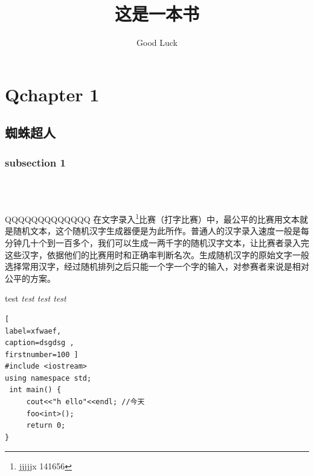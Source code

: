 \documentclass[12pt,hyperref,UTF8]{ctexbook}
\title{这是一本书}                              %
\author{Good Luck}                              %
\begin{document}
\frontmatter
\maketitle                        %

\cleardoublepage

\pagestyle{headings}              %

\tableofcontents                  %
 
 

\mainmatter

\pagestyle{mainFancy}
 

\cleardoublepage
%
%
\chapter{ Qchapter 1}
\section{蜘蛛超人}
\label{testsection}

\subsection{subsection 1}

{\small{}\\}
{\small{}\\}
{\small{}}

QQQQQQQQQQQQQ
在文字录入\footnote{jjjjjx 141656}比赛（打字比赛）中，最公平的比赛用文本就是随机文本，这个随机汉字生成器便是为此所作。普通人的汉字录入速度一般是每分钟几十个到一百多个，我们可以生成一两千字的随机汉字文本，让比赛者录入完这些汉字，依据他们的比赛用时和正确率判断名次。生成随机汉字的原始文字一般选择常用汉字，经过随机排列之后只能一个字一个字的输入，对参赛者来说是相对公平的方案。

{
test \itshape test \ttfamily test \upshape test
}

\begin{lstlisting}[
label=xfwaef,
caption=dsgdsg ,
firstnumber=100 ] 
#include <iostream> 
using namespace std;
 int main() { 
     cout<<"h ello"<<endl; //今天
     foo<int>();
     return 0;
} 
\end{lstlisting}
\end{document}
